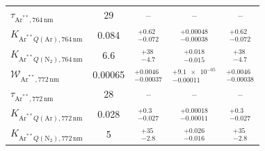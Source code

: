 \begin{table}[htbp]
\begin{tabular}{lcccc}
$\tau_{\mathrm{Ar}^{**},764\,\mathrm{nm}}$ & \num{29} & -- & -- & -- \\
$K_{\mathrm{Ar}^{**}Q(\mathrm{Ar}),764\,\mathrm{nm}}$ & \num{0.084} & $^{+\num{0.62}}_{-\num{0.072}}$ & $^{+\num{0.00048}}_{-\num{0.00038}}$ & $^{+\num{0.62}}_{-\num{0.072}}$ \\
$K_{\mathrm{Ar}^{**}Q(\mathrm{N}_2),764\,\mathrm{nm}}$ & \num{6.6} & $^{+\num{38}}_{-\num{4.7}}$ & $^{+\num{0.018}}_{-\num{0.015}}$ & $^{+\num{38}}_{-\num{4.7}}$ \\
$\mathcal{W}_{\mathrm{Ar}^{**},772\,\mathrm{nm}}$ & \num{0.00065} & $^{+\num{0.0046}}_{-\num{0.00037}}$ & $^{+\num{9.1e-05}}_{-\num{0.00011}}$ & $^{+\num{0.0046}}_{-\num{0.00038}}$ \\
$\tau_{\mathrm{Ar}^{**},772\,\mathrm{nm}}$ & \num{28} & -- & -- & -- \\
$K_{\mathrm{Ar}^{**}Q(\mathrm{Ar}),772\,\mathrm{nm}}$ & \num{0.028} & $^{+\num{0.3}}_{-\num{0.027}}$ & $^{+\num{0.00018}}_{-\num{0.00011}}$ & $^{+\num{0.3}}_{-\num{0.027}}$ \\
$K_{\mathrm{Ar}^{**}Q(\mathrm{N}_2),772\,\mathrm{nm}}$ & \num{5} & $^{+\num{35}}_{-\num{2.8}}$ & $^{+\num{0.026}}_{-\num{0.016}}$ & $^{+\num{35}}_{-\num{2.8}}$ \\
\bottomrule
\end{tabular}
\end{table}
